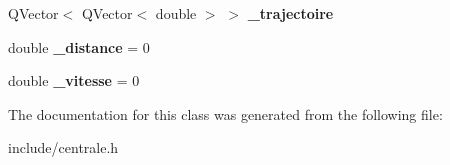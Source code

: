 \begin{DoxyCompactItemize}
\item 
\hypertarget{class_centrale_a4e1cbd3cdb6789fec0212b0637559662}{Q\-Vector$<$ Q\-Vector$<$ double $>$ $>$ {\bfseries \-\_\-trajectoire}}\label{class_centrale_a4e1cbd3cdb6789fec0212b0637559662}

\item 
\hypertarget{class_centrale_a91c3d819688724fdd2c5b52d8c0fd701}{double {\bfseries \-\_\-distance} = 0}\label{class_centrale_a91c3d819688724fdd2c5b52d8c0fd701}

\item 
\hypertarget{class_centrale_a143474d4e8e52156fbe2473cc996d62a}{double {\bfseries \-\_\-vitesse} = 0}\label{class_centrale_a143474d4e8e52156fbe2473cc996d62a}

\end{DoxyCompactItemize}


The documentation for this class was generated from the following file\-:\begin{DoxyCompactItemize}
\item 
include/centrale.\-h\end{DoxyCompactItemize}

